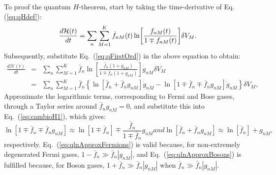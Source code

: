 


To proof the quantum $H$-theorem, start by taking the time-derivative of Eq. (\ref{eq:qHdef}):
%
\begin{equation}\label{eq:deltaH}
   \frac{d \mathcal{H} (t)}{dt}= \sum_n \sum_{M=1}^{K} \dot{f}_{nM}(t)\ln \left[ \frac{f_{nM}(t)}{1\mp f_{nM}(t)} \right] \de V_M.
\end{equation}
%
Subsequently, substitute Eq.~(\ref{eq:qFirstOrd}) in the above equation to obtain:
%
\begin{eqnarray}\label{eq:cambioH1}
    \frac{d\mathcal{H} (t)}{dt}&=&
      \sum_n \sum_{M=1}^{K} \bar{f}_{n}\ln \left[
        \frac{\bar{f}_{n}(1+g_{nM})}{1\mp \bar{f}_{n} (1+ g_{nM})}
      \right]\dot{g}_{nM} \delta V_M \nonumber \\
    &=&\sum_n \sum_{M=1}^{K} \bar{f}_n \left \{
      \ln [\bar{f}_n+\bar{f}_n g_{nM}]\dot{g}_{nM}
      -\ln [1\mp\bar{f}_n\mp\bar{f}_n g_{nM}]\dot{g}_{nM}
    \right \}\delta V_M,
\end{eqnarray}
%
Approximate the logarithmic terms, corresponding to
Fermi and Bose gases, through a Taylor series around $\bar f_n g_{nM}=0$, and
substitute this into Eq.~(\ref{eq:cambioH1}), which gives:
%
\begin{subequations}\label{eq:qlnApprox}
\begin{equation}\label{eq:qlnApproxFermions}
	\ln[1\mp\bar{f}_n\mp\bar{f}_n g_{nM}]
    	\approx \ln[1\mp\bar{f}_n]\mp\frac{\bar{f}_n}{1\mp\bar{f}_{n}} g_{nM}
\end{equation}
%
and
%
\begin{equation}\label{eq:qlnApproxBosons}
    \ln [\bar{f}_n+\bar{f}_n g_{nM}] \approx \ln [\bar{f}_n]+ g_{nM},
\end{equation}
\end{subequations}
%
respectively. Eq.~(\ref{eq:qlnApproxFermions}) is valid because, for non-extremely degenerated Fermi gases, 
$1-\bar{f}_n \gg \bar{f}_n|g_{nM}|$, and Eq.~(\ref{eq:qlnApproxBosons}) is fulfilled because,
for Boson gases,
$1+\bar{f}_n \gg \bar{f}_n |g_{nM}|$ when $\bar{f}_n \gg \bar{f}_n |g_{nM}|$.

